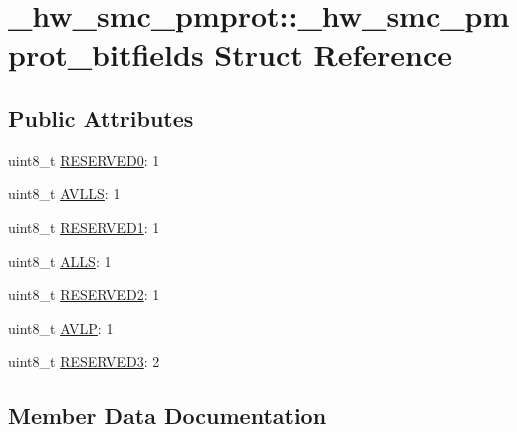 \hypertarget{struct__hw__smc__pmprot_1_1__hw__smc__pmprot__bitfields}{}\section{\+\_\+hw\+\_\+smc\+\_\+pmprot\+:\+:\+\_\+hw\+\_\+smc\+\_\+pmprot\+\_\+bitfields Struct Reference}
\label{struct__hw__smc__pmprot_1_1__hw__smc__pmprot__bitfields}
\subsection*{Public Attributes}
\begin{DoxyCompactItemize}
\item 
uint8\+\_\+t \hyperlink{struct__hw__smc__pmprot_1_1__hw__smc__pmprot__bitfields_ae23a6cafbdbc2367868578ac971ae011}{R\+E\+S\+E\+R\+V\+E\+D0}\+: 1
\item 
uint8\+\_\+t \hyperlink{struct__hw__smc__pmprot_1_1__hw__smc__pmprot__bitfields_aaa746d8ae4f8190f3f299946921c94f7}{A\+V\+L\+LS}\+: 1
\item 
uint8\+\_\+t \hyperlink{struct__hw__smc__pmprot_1_1__hw__smc__pmprot__bitfields_aa87c62048652f691a81a876f5f83d4a7}{R\+E\+S\+E\+R\+V\+E\+D1}\+: 1
\item 
uint8\+\_\+t \hyperlink{struct__hw__smc__pmprot_1_1__hw__smc__pmprot__bitfields_a565c619748eda4bd46294c688b92e87b}{A\+L\+LS}\+: 1
\item 
uint8\+\_\+t \hyperlink{struct__hw__smc__pmprot_1_1__hw__smc__pmprot__bitfields_a255c7f76411403c7bb56667eabd12ec3}{R\+E\+S\+E\+R\+V\+E\+D2}\+: 1
\item 
uint8\+\_\+t \hyperlink{struct__hw__smc__pmprot_1_1__hw__smc__pmprot__bitfields_a22f3de978ae953a0df5fb0802427c144}{A\+V\+LP}\+: 1
\item 
uint8\+\_\+t \hyperlink{struct__hw__smc__pmprot_1_1__hw__smc__pmprot__bitfields_ac64f849c3f2834e27252be8307d6b457}{R\+E\+S\+E\+R\+V\+E\+D3}\+: 2
\end{DoxyCompactItemize}


\subsection{Member Data Documentation}
